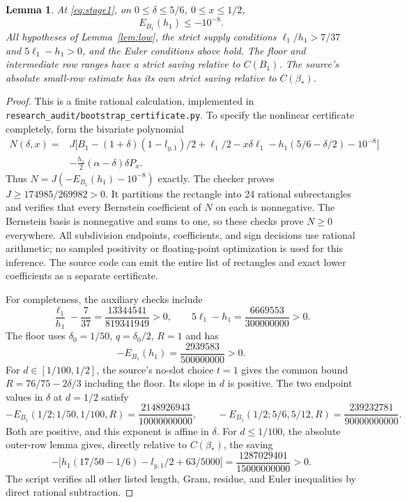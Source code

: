 \documentclass[11pt]{article}
\newtheorem{lemma}{Lemma}
\newcommand{\Bstar}{\beta_*}
\begin{document}
\begin{lemma}\label{lem:certificate}
At \eqref{eq:stage1}, on
$0\le\delta\le5/6$, $0\le x\le1/2$,
\[
 E_{B_1}(h_1)\le-10^{-8}.
\]
All hypotheses of Lemma~\ref{lem:low}, the strict supply conditions
$\ell_1/h_1>7/37$ and $5\ell_1-h_1>0$, and the Euler conditions
above hold. The floor and intermediate row ranges have a strict
saving relative to $C(B_1)$. The source's absolute small-row estimate
has its own strict saving relative to $C(\Bstar)$.
\end{lemma}
\begin{proof}
This is a finite rational calculation, implemented in
\nolinkurl{research_audit/bootstrap_certificate.py}. To specify the
nonlinear certificate completely, form the bivariate polynomial
\begin{align*}
 N(\delta,x)={}&J\bigl[B_1-(1+\delta)(1-l_{y,1})/2+\ell_1/2
 -x\delta\ell_1-h_1(5/6-\delta/2)-10^{-8}\bigr]\\
 &-\frac{h_1}{2}(\alpha-\delta)\delta P_x.
\end{align*}
Thus $N=J(-E_{B_1}(h_1)-10^{-8})$ exactly. The checker proves
$J\ge174985/269982>0$. It partitions the rectangle into 24 rational
subrectangles and verifies that every Bernstein coefficient of $N$ on
each is nonnegative. The Bernstein basis is nonnegative and sums to one,
so these checks prove $N\ge0$ everywhere. All subdivision endpoints,
coefficients, and sign decisions use rational arithmetic; no sampled
positivity or floating-point optimization is used for this inference.
The source code can emit the entire list of rectangles and exact lower
coefficients as a separate certificate.

For completeness, the auxiliary checks include
\[
 \frac{\ell_1}{h_1}-\frac7{37}
 =\frac{13344541}{819341949}>0,\qquad
 5\ell_1-h_1=\frac{6669553}{300000000}>0.
\]
The floor uses $\delta_0=1/50$, $q=\delta_0/2$, $R=1$ and has
\[
 -E_{B_1}(h_1)=\frac{2939583}{500000000}>0.
\]
For $d\in[1/100,1/2]$, the source's no-slot choice $t=1$ gives the
common bound $R=76/75-2\delta/3$ including the floor. Its slope in
$d$ is positive. The two endpoint values in $\delta$ at $d=1/2$
satisfy
\[
 -E_{B_1}(1/2;1/50,1/100,R)=\frac{2148926943}{10000000000},
 \qquad
 -E_{B_1}(1/2;5/6,5/12,R)=\frac{239232781}{90000000000}.
\]
Both are positive, and this exponent is affine in $\delta$.
For $d\le1/100$, the absolute outer-row lemma gives, directly relative
to $C(\Bstar)$, the saving
\[
 -\bigl[h_1(17/50-1/6)-l_{y,1}/2+63/5000\bigr]
 =\frac{1287029401}{15000000000}>0.
\]
The script verifies all other listed length, Gram, residue, and Euler
inequalities by direct rational subtraction.
\end{proof}
\end{document}
